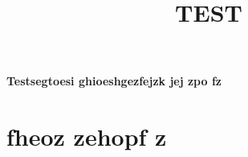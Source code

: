 \title{TEST} 

\paragraph{Testsegtoesi \newline ghioeshgezfejzk jej zpo fz}
\section{fheoz zeho\newline pf z}

